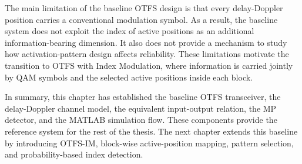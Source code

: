 The main limitation of the baseline OTFS design is that every delay-Doppler position carries a conventional modulation symbol. As a result, the baseline system does not exploit the index of active positions as an additional information-bearing dimension. It also does not provide a mechanism to study how activation-pattern design affects reliability. These limitations motivate the transition to OTFS with Index Modulation, where information is carried jointly by QAM symbols and the selected active positions inside each block.

In summary, this chapter has established the baseline OTFS transceiver, the delay-Doppler channel model, the equivalent input-output relation, the MP detector, and the MATLAB simulation flow. These components provide the reference system for the rest of the thesis. The next chapter extends this baseline by introducing OTFS-IM, block-wise active-position mapping, pattern selection, and probability-based index detection.

